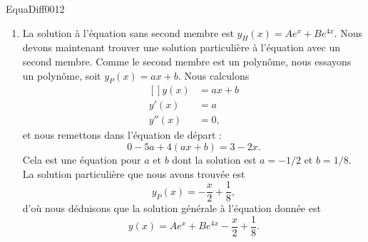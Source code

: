 \begin{corrige}{EquaDiff0012}

	\begin{enumerate}

		\item
			La solution à l'équation sans second membre est $y_H(x)=Ae^x+B e^{4x}$. Nous devons maintenant trouver une solution particulière à l'équation avec un second membre. Comme le second membre est un polynôme, nous essayons un polynôme, soit $y_P(x)=ax+b$. Nous calculons
			\begin{equation}
				\begin{aligned}[]
					y(x)&=ax+b\\
					y'(x)&=a\\
					y''(x)&=0,
				\end{aligned}
			\end{equation}
			et nous remettons dans l'équation de départ :
			\begin{equation}
				0-5a+4(ax+b)=3-2x.
			\end{equation}
			Cela est une équation pour $a$ et $b$ dont la solution est $a=-1/2$ et $b=1/8$. La solution particulière que nous avons trouvée est
			\begin{equation}
				y_P(x)=-\frac{ x }{ 2 }+\frac{1}{ 8 },
			\end{equation}
			d'où nous déduisons que la solution générale à l'équation donnée est
			\begin{equation}
				y(x)=A e^{x}+B e^{4x}-\frac{ x }{ 2 }+\frac{1}{ 8 }.
			\end{equation}
			

\end{enumerate}
\end{corrige}
